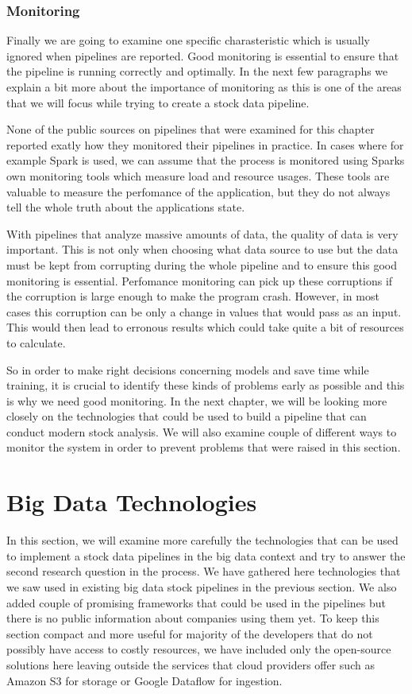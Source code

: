 \subsubsection{Monitoring}

Finally we are going to examine one specific charasteristic which is usually ignored when pipelines are reported.
Good monitoring is essential to ensure that the pipeline is running correctly and optimally.
In the next few paragraphs we explain a bit more about the importance of monitoring as this is one of the areas that we will focus while trying to create a stock data pipeline.

None of the public sources on pipelines that were examined for this chapter reported exatly how they monitored their pipelines in practice.
In cases where for example Spark is used, we can assume that the process is monitored using Sparks own monitoring tools which measure load and resource usages.
These tools are valuable to measure the perfomance of the application, but they do not always tell the whole truth about the applications state.

With pipelines that analyze massive amounts of data, the quality of data is very important.
This is not only when choosing what data source to use but the data must be kept from corrupting during the whole pipeline and to ensure this good monitoring is essential.
Perfomance monitoring can pick up these corruptions if the corruption is large enough to make the program crash.
However, in most cases this corruption can be only a change in values that would pass as an input.
This would then lead to erronous results which could take quite a bit of resources to calculate.

So in order to make right decisions concerning models and save time while training, it is crucial to identify these kinds of problems early as possible and this is why we need good monitoring.
In the next chapter, we will be looking more closely on the technologies that could be used to build a pipeline that can conduct modern stock analysis.
We will also examine couple of different ways to monitor the system in order to prevent problems that were raised in this section.



\section{Big Data Technologies}

In this section, we will examine more carefully the technologies that can be used to implement a stock data pipelines in the big data context and try to answer the second research question in the process.
We have gathered here technologies that we saw used in existing big data stock pipelines in the previous section.
We also added couple of promising frameworks that could be used in the pipelines but there is no public information about companies using them yet.
To keep this section compact and more useful for majority of the developers that do not possibly have access to costly resources, we have included only the open-source solutions here leaving outside the services that cloud providers offer such as Amazon S3 for storage or Google Dataflow for ingestion.

